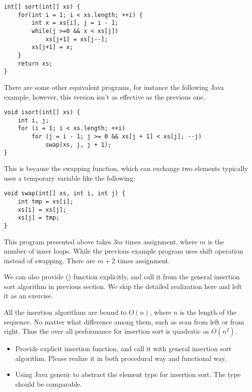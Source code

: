 \documentclass{article}
\begin{document}
\lstset{language=Java}
\begin{lstlisting}
int[] sort(int[] xs) {
    for(int i = 1; i < xs.length; ++i) {
        int x = xs[i], j = i - 1;
        while(j >=0 && x < xs[j])
            xs[j+1] = xs[j--];
        xs[j+1] = x;
    }
    return xs;
}
\end{lstlisting}

There are some other equivalent programs, for instance the following
Java example, however, this version isn't as effective as the previous one.

\lstset{language=Java}
\begin{lstlisting}
void isort(int[] xs) {
    int i, j;
    for (i = 1; i < xs.length; ++i)
        for (j = i - 1; j >= 0 && xs[j + 1] < xs[j]; --j)
            swap(xs, j, j + 1);
}
\end{lstlisting}

This is because the swapping function, which can exchange two elements
typically uses a temporary variable like the following:

\begin{lstlisting}
void swap(int[] xs, int i, int j) {
    int tmp = xs[i];
    xs[i] = xs[j];
    xs[j] = tmp;
}
\end{lstlisting}

This program presented above takes $3m$ times assignment, where $m$
is the number of inner loops. While the previous example
program uses shift operation instead of swapping. There are $m+2$ times
assignment.

We can also provide () function explicitly, and call it
from the general insertion sort algorithm in previous section. We skip
the detailed realization here and left it as an exercise.

All the insertion algorithms are bound to $O(n)$, where $n$ is the length of
the sequence. No matter what difference among them, such as scan from left
or from right. Thus the over all performance for insertion sort is quadratic
as $O(n^2)$.

\begin{Exercise}

\begin{itemize}
\item Provide explicit insertion function, and call it with general
insertion sort algorithm. Please realize it in both procedural way and
functional way.
\item Using Java generic to abstract the element type for insertion sort. The
type should be comparable.
\end{itemize}

\end{Exercise}
\end{document}
